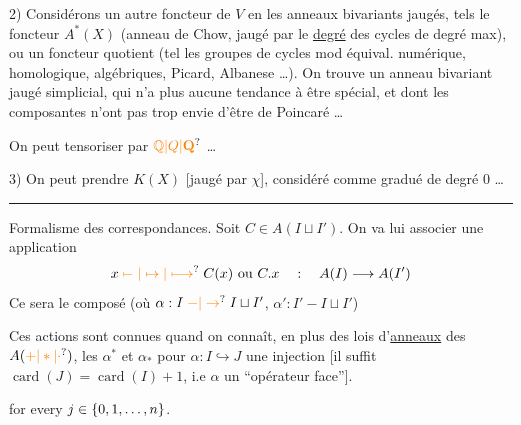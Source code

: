 2) Considérons un autre foncteur de $V$ en les
anneaux bivariants jaugés, tels le foncteur
$A^*(X)$ (anneau de Chow,  jaugé par le
\uline{degré} des cycles de degré max), ou un foncteur
quotient (tel les groupes de cycles mod équival.
numérique, homologique, \inserted{$\tau$,} algébriques, Picard, Albanese \ldots).
On trouve un anneau bivariant jaugé simplicial, qui
n'a plus aucune tendance à être spécial, et dont
les composantes n'ont pas trop envie d'être de
Poincaré \ldots

On peut tensoriser par $\unsure{\mathbb{Q}|Q|\mathbf{Q}}$ \ldots

3) On peut prendre $K(X)$ [jaugé par $\chi$], considéré comme
gradué de degré 0 \ldots

\noindent\rule{.48\linewidth}{.3pt}

Formalisme des correspondances. Soit $C\in A(I\sqcup I')$. On
va lui associer une application
\[
x\mathrel{\unsure{\mapstochar\relbar|\mapsto|\longmapsto}} C(x)\ \text{ou}\ C.x\quad :\quad A(I)\longrightarrow A(I')
\]
Ce sera le composé (où $\alpha:I\mathrel{\unsure{-|\to}}I\sqcup I'$, $\alpha':I'\mathrel{-}I\sqcup I'$)

Ces actions sont connues quand on connaît, en plus
des lois d'\uline{anneaux} des $A(\unsure{+|*|\cdot})$, les $\alpha^*$ et $\alpha_*$
pour $\alpha:I\hookrightarrow J$ une injection [il suffit 
$\operatorname{card}(J)=\operatorname{card}(I)+1$, i.e $\alpha$ un ``opérateur face''].

for every $j\in\{0,1,\ldots,n\}$.

